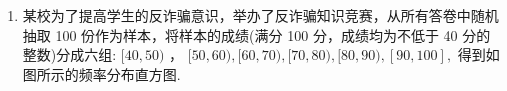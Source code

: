 \begin{enumerate}
    \begin{enumerate}
        \item 求实数 $a$ 的值
        \item 在样本中, 采取按比例分层抽样的方法从成绩在 $[90,150]$ 内的学生中抽取 13 名, 问其中成绩在 $[130,150]$ 的学生有几名?
        \item 根据图中的样本数据，假设同组中每个数据用该组区间的中点值代替，试估计本次考试的平均分.
    \end{enumerate}
    \begin{jieda}
        \begin{enumerate}
            \item 由频率分布直方图知：
            $\left( {{0.0025} + {0.005} \times  2 + {0.01} + a + {0.015}}\right)  \times  {20} = 1$ ,
            解得 $a = {0.0125}$ .
            \item 采取分层抽样,[130,150]的学生个数为： $\dfrac{0.005}{{0.005} + {0.015} + {0.0125}} \times  {13} = 2$ ,
            即成绩在 $\left\lbrack  {{130},{150}}\right\rbrack$ 的学生有 2 名.
            \item 由频率分布直方图知：平均数为：
            $\left( {{40} \times  {0.0025} + {60} \times  {0.005} + {80} \times  {0.01} + {100} \times  {0.015} + {120} \times  {0.0125} + {140} \times  {0.005}}\right)  \times  {20} = {98}$
        \end{enumerate}
    \end{jieda}
    
    \item 某校为了提高学生的反诈骗意识，举办了反诈骗知识竞赛，从所有答卷中随机抽取 100 份作为样本，将样本的成绩(满分 100 分，成绩均为不低于 40 分的整数)分成六组: $\lbrack {40},{50})$ ， $\lbrack {50},{60}),\lbrack {60},{70}),\lbrack {70},{80}),\lbrack {80},{90}),\left\lbrack  {{90},{100}}\right\rbrack  ,$ 得到如图所示的频率分布直方图.


\end{enumerate}
